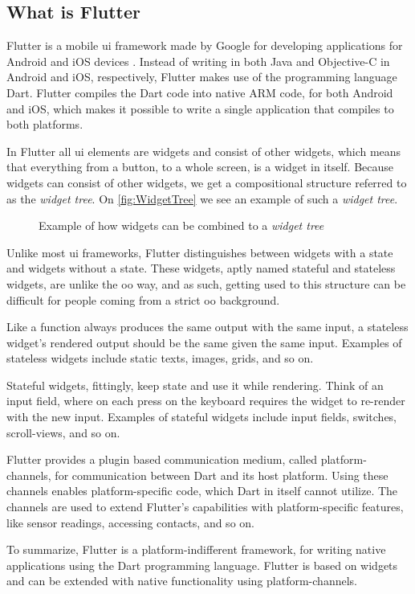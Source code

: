 \subsection{What is Flutter}

Flutter is a mobile \gls{ui} framework made by Google for developing applications for Android and iOS devices \cite{flutterFAQ}. Instead of writing in both Java and Objective-C in Android and iOS, respectively, Flutter makes use of the programming language Dart. Flutter compiles the Dart code into native ARM code, for both Android and iOS, which makes it possible to write a single application that compiles to both platforms. 

In Flutter all \gls{ui} elements are widgets and consist of other widgets, which means that everything from a button, to a whole screen, is a widget in itself. Because widgets can consist of other widgets, we get a compositional structure referred to as the \textit{widget tree}. On \autoref{fig:WidgetTree} we see an example of such a \textit{widget tree}.

\begin{figure}[h]
    \centering
    \caption{Example of how widgets can be combined to a \textit{widget tree}}
    \label{fig:WidgetTree}
\end{figure}

Unlike most \gls{ui} frameworks, Flutter distinguishes between widgets with a state and widgets without a state. These widgets, aptly named stateful and stateless widgets, are unlike the \gls{oo} way, and as such, getting used to this structure can be difficult for people coming from a strict \gls{oo} background.

Like a function always produces the same output with the same input, a stateless widget's rendered output should be the same given the same input. Examples of stateless widgets include static texts, images, grids, and so on. 

Stateful widgets, fittingly, keep state and use it while rendering. Think of an input field, where on each press on the keyboard requires the widget to re-render with the new input. Examples of stateful widgets include input fields, switches, scroll-views, and so on.

Flutter provides a plugin based communication medium, called platform-channels, for communication between Dart and its host platform\cite{flutter_plugins}. Using these channels enables platform-specific code, which Dart in itself cannot utilize. The channels are used to extend Flutter's capabilities with platform-specific features, like sensor readings, accessing contacts, and so on.

To summarize, Flutter is a platform-indifferent framework, for writing native applications using the Dart programming language. Flutter is based on widgets and can be extended with native functionality using platform-channels.
